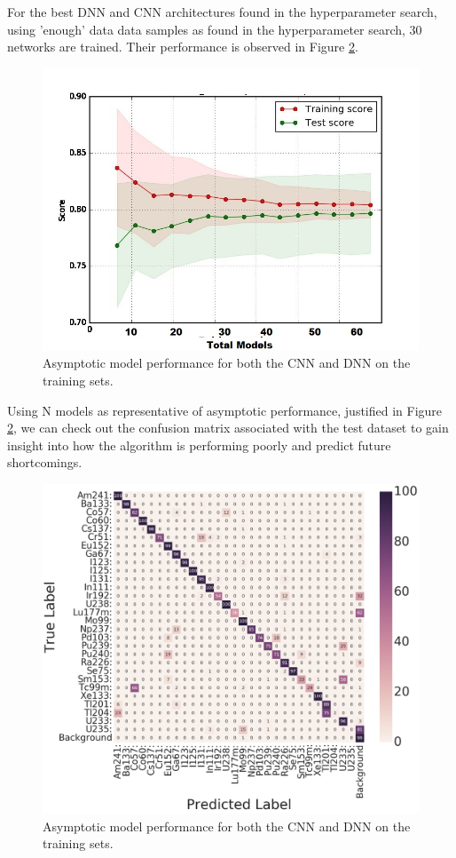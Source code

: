 For the best DNN and CNN architectures found in the hyperparameter search, using 'enough' data data samples as found in the hyperparameter search, 30 networks are trained. Their performance is observed in Figure \ref{fig:asymptotic_performance}.


\begin{figure}[H]
	\centering
	\includegraphics[width=0.8\linewidth]{model_choice_hyperparameter_search_images/asymptotic_performance_dummy}
	\caption{Asymptotic model performance for both the CNN and DNN on the training sets.}
	\label{fig:asymptotic_performance}
\end{figure}

Using N models as representative of asymptotic performance, justified in Figure \ref{fig:asymptotic_performance}, we can check out the confusion matrix associated with the test dataset to gain insight into how the algorithm is performing poorly and predict future shortcomings.


\begin{figure}[H]
	\centering
	\includegraphics[width=0.8\linewidth]{model_choice_hyperparameter_search_images/conf_matrix_example}
	\caption{Asymptotic model performance for both the CNN and DNN on the training sets.}
	\label{fig:asymptotic_performance}
\end{figure}

